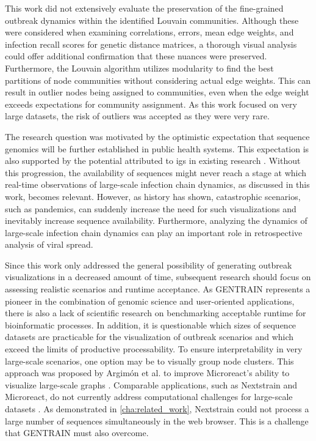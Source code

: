 This work did not extensively evaluate the preservation of the fine-grained outbreak dynamics within the identified Louvain communities. Although these were considered when examining correlations, errors, mean edge weights, and infection recall scores for genetic distance matrices, a thorough visual analysis could offer additional confirmation that these nuances were preserved.
Furthermore, the Louvain algorithm utilizes modularity to find the best partitions of node communities without considering actual edge weights. This can result in outlier nodes being assigned to communities, even when the edge weight exceeds expectations for community assignment. As this work focused on very large datasets, the risk of outliers was accepted as they were very rare.

The research question was motivated by the optimistic expectation that sequence genomics will be further established in public health systems. This expectation is also supported by the potential attributed to \acrshort{igs} in existing research \cite{Blu1, Han1}. Without this progression, the availability of sequences might never reach a stage at which real-time observations of large-scale infection chain dynamics, as discussed in this work, becomes relevant. However, as history has shown, catastrophic scenarios, such as pandemics, can suddenly increase the need for such visualizations and inevitably increase sequence availability. Furthermore, analyzing the dynamics of large-scale infection chain dynamics can play an important role in retrospective analysis of viral spread.

Since this work only addressed the general possibility of generating outbreak visualizations in a decreased amount of time, subsequent research should focus on assessing realistic scenarios and runtime acceptance. As GENTRAIN represents a pioneer in the combination of genomic science and user-oriented applications, there is also a lack of scientific research on benchmarking acceptable runtime for bioinformatic processes. In addition, it is questionable which sizes of sequence datasets are practicable for the visualization of outbreak scenarios and which exceed the limits of productive processability. To ensure interpretability in very large-scale scenarios, one option may be to visually group node clusters. This approach was proposed by Argimón et al. to improve Microreact's ability to visualize large-scale graphs \cite{Mic1}. Comparable applications, such as Nextstrain and Microreact, do not currently address computational challenges for large-scale datasets \cite{Nex9, Mic1}. As demonstrated in \ref{cha:related_work}, Nextstrain could not process a large number of sequences simultaneously in the web browser. This is a challenge that GENTRAIN must also overcome.

